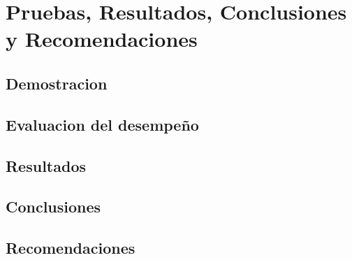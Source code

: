 \chapter{Pruebas, Resultados, Conclusiones y Recomendaciones}
\section{Demostracion}
\section{Evaluacion del desempeño}
\section{Resultados}
\section{Conclusiones}
\section{Recomendaciones}